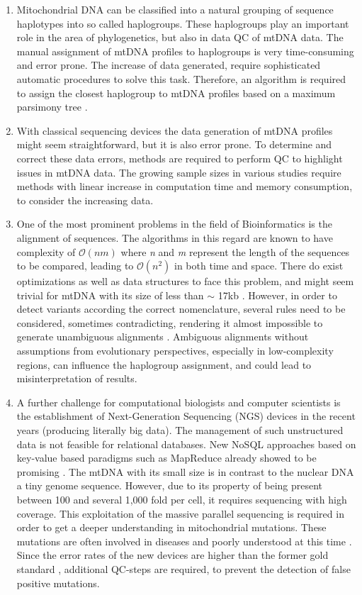 \begin{enumerate}
\item 
Mitochondrial DNA can be classified into a natural grouping of sequence haplotypes into so called haplogroups. These haplogroups play an important role in the area of phylogenetics, but also in data QC of mtDNA data. The manual assignment of mtDNA profiles to haplogroups is very time-consuming and error prone. The increase of data generated, require sophisticated automatic procedures to solve this task. Therefore, an algorithm is required to assign the closest haplogroup to mtDNA profiles based on a maximum parsimony tree \cite{VanOven2009}. 
\item
With classical sequencing devices the data generation of mtDNA profiles might seem straightforward, but it is also error prone. To determine and correct these data errors, methods are required to perform QC to highlight issues in mtDNA data. The growing sample sizes in various studies require methods with linear increase in computation time and memory consumption, to consider the increasing data. 
\item 
One of the most prominent problems in the field of Bioinformatics is the alignment of sequences. The algorithms in this regard are known to have complexity of $\mathcal O(nm)$ where \textit{n} and \textit{m} represent the length of the sequences to be compared, leading to $\mathcal O(n^2)$ in both time and space. There do exist optimizations as well as data structures to face this problem, and might seem trivial for mtDNA with its size of less than $\sim$ 17kb \cite{Andrews1999}. However, in order to detect variants according the correct nomenclature, several rules need to be considered, sometimes contradicting, rendering it almost impossible to generate unambiguous alignments \cite{Bandelt2008}. Ambiguous alignments without assumptions from evolutionary perspectives, especially in low-complexity regions, can influence the haplogroup assignment, and could lead to misinterpretation of results.  
\item 
A further challenge for computational biologists and computer scientists is the establishment of Next-Generation Sequencing (NGS) devices in the recent years (producing literally big data). The management of such unstructured data is not feasible for relational databases. New NoSQL approaches based on key-value based paradigms such as MapReduce \cite{Dean2008} already showed to be promising \cite{Schonherr2012}. The mtDNA with its small size is in contrast to the nuclear DNA a tiny genome sequence. However, due to its property of being present between 100 and several 1,000 fold per cell, it requires sequencing with high coverage. This exploitation of the massive parallel sequencing is required in order to get a deeper understanding in mitochondrial mutations. These mutations are often involved in diseases and poorly understood at this time \cite{Wallace2013}. Since the error rates of the new devices are higher than the former gold standard \cite{Wang2011}, additional QC-steps are required, to prevent the detection of false positive mutations. 

\end{enumerate}

